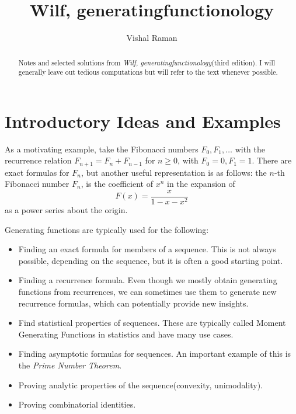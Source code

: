 \documentclass[11pt]{article}
\renewcommand{\>}{\rangle}
\newcommand{\<}{\langle}
\begin{document}
\title{Wilf, generatingfunctionology}
\author{Vishal Raman}
\maketitle
\begin{abstract}
Notes and selected solutions from \textit{Wilf, generatingfunctionology}(third edition).  I will generally leave out tedious computations but will refer to the text whenever possible.
\end{abstract}
\tableofcontents
\pagebreak

\section{Introductory Ideas and Examples}
As a motivating example, take the Fibonacci numbers $F_0, F_1, \dots$ with the recurrence relation $F_{n+1} = F_n + F_{n-1}$ for $n \ge 0$, with $F_0 = 0, F_1 = 1$.  There are exact formulas for $F_n$, but another useful representation is as follows:  the $n$-th Fibonacci number $F_n$, is the coefficient of $x^n$ in the expansion of 
$$F(x) = \frac{x}{1 - x - x^2}$$
as a power series about the origin.  

Generating functions are typically used for the following:
\begin{itemize}
\item Finding an exact formula for members of a sequence.  This is not always possible, depending on the sequence, but it is often a good starting point.
\item Finding a recurrence formula.  Even though we mostly obtain generating functions from recurrences, we can sometimes use them to generate new recurrence formulas, which can potentially provide new insights.
\item Find statistical properties of sequences.  These are typically called Moment Generating Functions in statistics and have many use cases.
\item Finding asymptotic formulas for sequences.  An important example of this is the \textit{Prime Number Theorem}.
\item Proving analytic properties of the sequence(convexity, unimodality).
\item Proving combinatorial identities.  
\end{itemize}
 
\end{document}
